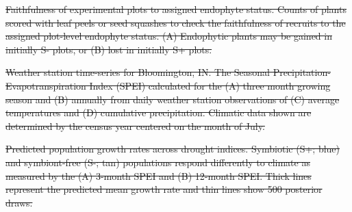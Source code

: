\documentclass[lineno, sn-basic]{sn-jnl}%
\providecommand{\DIFdel}[1]{{\protect\color{red}\protect\scriptsize\sout{#1}}}
\providecommand{\DIFdel}[1]{{\protect\color{red}\sout{#1}}}                      %
\providecommand{\DIFdelbegin}{} %
\providecommand{\DIFdelFL}[1]{\DIFdel{#1}} %
\providecommand{\DIFaddbeginFL}{} %
\providecommand{\DIFaddendFL}{} %
\providecommand{\DIFdelbeginFL}{} %
\providecommand{\DIFdelendFL}{} %
\newcommand{\DIFscaledelfig}{0.5}
\newlength{\DIFdelgraphicswidth} %
\newlength{\DIFdelgraphicsheight} %
\newcommand{\DIFaddincludegraphics}[2][]{{\color{blue}\fbox{\DIFOincludegraphics[#1]{#2}}}} %
\newcommand{\DIFdelincludegraphics}[2][]{%
\sbox{\DIFdelgraphicsbox}{\DIFOincludegraphics[#1]{#2}}%
\settoboxwidth{\DIFdelgraphicswidth}{\DIFdelgraphicsbox} %
\settoboxtotalheight{\DIFdelgraphicsheight}{\DIFdelgraphicsbox} %
\scalebox{\DIFscaledelfig}{%
\parbox[b]{\DIFdelgraphicswidth}{\usebox{\DIFdelgraphicsbox}\\[-\baselineskip] \rule{\DIFdelgraphicswidth}{0em}}\llap{\resizebox{\DIFdelgraphicswidth}{\DIFdelgraphicsheight}{%
\setlength{\unitlength}{\DIFdelgraphicswidth}%
\begin{picture}(1,1)%
\thicklines\linethickness{2pt} %
{\color[rgb]{1,0,0}\put(0,0){\framebox(1,1){}}}%
{\color[rgb]{1,0,0}\put(0,0){\line( 1,1){1}}}%
{\color[rgb]{1,0,0}\put(0,1){\line(1,-1){1}}}%
\end{picture}%
}\hspace*{3pt}}} %
} %
\DeclareRobustCommand{\DIFdelbegin}{\DIFOdelbegin \let\includegraphics\DIFdelincludegraphics} %
\DeclareRobustCommand{\DIFaddbeginFL}{\DIFOaddbeginFL \let\includegraphics\DIFaddincludegraphics} %
\DeclareRobustCommand{\DIFaddendFL}{\DIFOaddendFL \let\includegraphics\DIFOincludegraphics} %
\DeclareRobustCommand{\DIFdelbeginFL}{\DIFOdelbeginFL \let\includegraphics\DIFdelincludegraphics} %
\DeclareRobustCommand{\DIFdelendFL}{\DIFOaddendFL \let\includegraphics\DIFOincludegraphics} %
\begin{document}
\DIFdelbegin %
\DIFdelendFL \DIFaddbeginFL \begin{myfigure}[H]
	\DIFaddendFL \centering
	\DIFdelbeginFL %
\DIFdelFL{Faithfulness of experimental plots to assigned endophyte status. Counts of plants scored with leaf peels or seed squashes to check the faithfulness of recruits to the assigned plot-level endophyte status. (A) Endophytic plants may be gained in initially S- plots, or (B) lost in initially S+ plots.}%

\DIFdelFL{Weather station time-series for Bloomington, IN. The Seasonal Precipitation-Evapotranspiration Index (SPEI) calculated for the (A) three month growing season and (B) annually from daily weather station observations of (C) average temperatures and (D) cumulative precipitation. Climatic data shown are determined by the census year centered on the month of July.}%

\DIFdelFL{Predicted population growth rates across drought indices. Symbiotic (S+; blue) and symbiont-free (S-; tan) populations respond differently to climate as measured by the (A) 3-month SPEI and (B) 12-month SPEI. Thick lines represent the predicted mean growth rate and thin lines show 500 posterior draws.}%


\end{myfigure}
\end{document}
